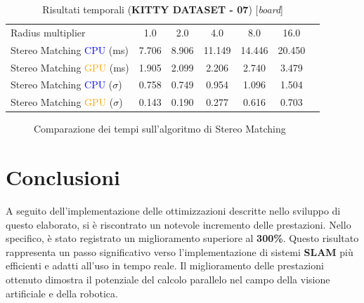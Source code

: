 \documentclass[12pt,a4paper]{report}
\begin{document}

\newpage
\begin{table}[H]
    \centering
    \caption{Risultati temporali (\textbf{KITTY DATASET - 07}) [\textit{board}] }
    \begin{tabular}{lcccccc}
        \toprule
        \rowcolor{gray!20}
        Radius multiplier & 1.0 & \cellcolor{orange!40}2.0 & 4.0 & 8.0 & 16.0 \\
        Stereo Matching \textcolor{blue}{CPU} (ms) & 7.706 & 8.906 & 11.149 & 14.446 & 20.450\\
        Stereo Matching \textcolor{orange}{GPU} (ms) & 1.905 & 2.099 & 2.206 & 2.740 & 3.479 \\
        Stereo Matching \textcolor{blue}{CPU} ($\sigma$) & 0.758 & 0.749 & 0.954 & 1.096 & 1.504\\
        Stereo Matching \textcolor{orange}{GPU} ($\sigma$) & 0.143 & 0.190 & 0.277 & 0.616 & 0.703 \\
        \bottomrule
    \end{tabular}
\end{table}

\begin{figure}[H]
    \centering
    \caption{Comparazione dei tempi sull'algoritmo di Stereo Matching }
\end{figure}



\chapter{Conclusioni}

A seguito dell'implementazione delle ottimizzazioni descritte nello sviluppo di questo elaborato, si è riscontrato un notevole incremento delle prestazioni. Nello specifico, è stato registrato un miglioramento superiore al \textbf{300\%}.
Questo risultato rappresenta un passo significativo verso l'implementazione di sistemi \textbf{SLAM} più efficienti e adatti all'uso in tempo reale. Il miglioramento delle prestazioni ottenuto dimostra il potenziale del calcolo parallelo nel campo della visione artificiale e della robotica.
\end{document}

